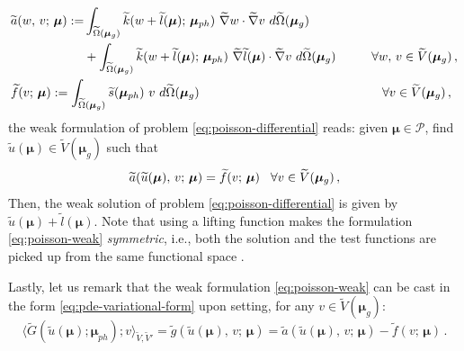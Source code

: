 \documentclass[12pt, a4paper, twoside, openright, notitlepage]{report}
\numberwithin{equation}{chapter}
\theoremstyle{theorem}
\theoremstyle{definition}
\theoremstyle{remark}
\theoremstyle{proposition}
\numberwithin{figure}{chapter}
\newcommand{\wt}[1]{\widetilde{#1}}
\newcommand{\bg}[1]{\boldsymbol{#1}}
\begin{document}
		\begin{subequations}
			\label{eq:poisson-weak-forms}
			\begin{align}
				&
				\begin{aligned}
				\wt{a}(w, \, v; \, \bg{\mu}) := & \int_{\wt{\Omega}(\bg{\mu}_g)} \wt{k}(w + \wt{l}(\bg{\mu}); \, \bg{\mu}_{ph}) ~ \wt{\nabla} w \cdot \wt{\nabla} v ~ d\wt{\Omega}(\bg{\mu}_g) \\
				& + \int_{\wt{\Omega}(\bg{\mu}_g)} \wt{k}(w + \wt{l}(\bg{\mu}); \, \bg{\mu}_{ph}) ~ \wt{\nabla} \wt{l}(\bg{\mu}) \cdot \wt{\nabla} v ~ d\wt{\Omega}(\bg{\mu}_g) \hspace*{1cm} \forall w, \, v \in \wt{V}(\bg{\mu}_g) \, , 
				\end{aligned} \\
				& \wt{f}(v; \, \bg{\mu}) := \int_{\wt{\Omega}(\bg{\mu}_g)} \wt{s}(\bg{\mu}_{ph}) ~ v ~ d\wt{\Omega}(\bg{\mu}_g) \hspace*{1cm} \hspace*{4.125cm} \forall v \in \wt{V}(\bg{\mu}_g) \, ,
			\end{align}
		\end{subequations}
		the weak formulation of problem \eqref{eq:poisson-differential} reads: given $\bg{\mu} \in \mathcal{P}$, find $\wt{u}(\bg{\mu}) \in \wt{V}(\bg{\mu}_g)$ such that
		\begin{equation}
			\label{eq:poisson-weak}
			\wt{a}(\wt{u}(\bg{\mu}), \, v; \, \bg{\mu}) = \wt{f}(v; \, \bg{\mu}) \hspace*{0.3cm} \forall v \in \wt{V}(\bg{\mu}_g) \, , 
		\end{equation}
		Then, the weak solution of problem \eqref{eq:poisson-differential} is given by $\wt{u}(\bg{\mu}) + \wt{l}(\bg{\mu})$. Note that using a lifting function makes the formulation \eqref{eq:poisson-weak} \emph{symmetric}, i.e., both the solution and the test functions are picked up from the same functional space \cite{Qua10}.
		
		Lastly, let us remark that the weak formulation \eqref{eq:poisson-weak} can be cast in the form \eqref{eq:pde-variational-form} upon setting, for any $v \in \wt{V}(\bg{\mu}_g)$:
			\begin{equation*}
				\langle \wt{G}(\wt{u}(\bg{\mu}); \bg{\mu}_{ph}); v \rangle_{\wt{V},\wt{V}'} = \wt{g}(\wt{u}(\bg{\mu}), \, v; \, \bg{\mu}) = \wt{a}(\wt{u}(\bg{\mu}), \, v; \, \bg{\mu}) - \wt{f}(v; \, \bg{\mu}) \, .
			\end{equation*}
			
	\vspace*{0.01cm}
		
\end{document}
